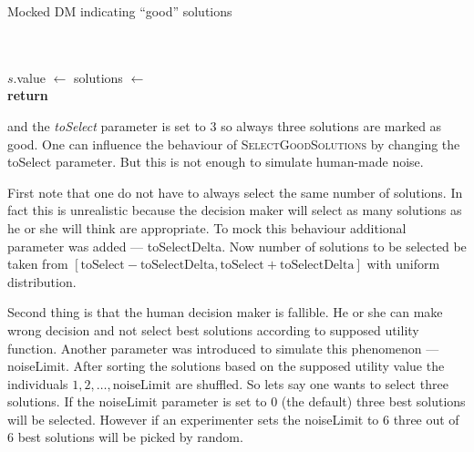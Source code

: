 \begin{algorithm}
\caption{Mocked DM indicating ``good'' solutions}\label{alg:dmselection}
  \begin{algorithmic}[1]
     \\
     \\
    \State $s.$value $\gets$ 
    \EndFor
    \State solutions $\gets$  \\
    \State \textbf{return} 
    \EndProcedure
  \end{algorithmic}
\end{algorithm}

and the \textit{toSelect} parameter is set to $3$ so always three solutions
are marked as good. One can influence the behaviour of
\textsc{SelectGoodSolutions} by changing the toSelect parameter. But this is
not enough to simulate human-made noise.

First note that one do not have to always select the same number of
solutions. In fact this is unrealistic because the decision maker will select
as many solutions as he or she will think are appropriate. To mock this
behaviour additional parameter was added --- toSelectDelta. Now number of
solutions to be selected be taken from $[\text{toSelect} -
  \text{toSelectDelta}, \text{toSelect} + \text{toSelectDelta}]$ with uniform
distribution.

Second thing is that the human decision maker is fallible. He or she can make
wrong decision and not select best solutions according to supposed utility
function. Another parameter was introduced to simulate this phenomenon ---
noiseLimit. After sorting the solutions based on the supposed utility value
the individuals $1, 2, \dots, \text{noiseLimit}$ are shuffled. So lets say one
wants to select three solutions. If the noiseLimit parameter is set to $0$
(the default) three best solutions will be selected. However if an
experimenter sets the noiseLimit to $6$ three out of $6$ best solutions will
be picked by random.

